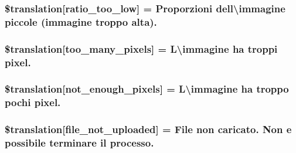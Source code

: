 \subsubsection[{\$translation}]{\setlength{\rightskip}{0pt plus 5cm}\$translation\mbox{[}\textquotesingle{}ratio\+\_\+too\+\_\+low\textquotesingle{}\mbox{]} = \textquotesingle{}Proporzioni dell\textbackslash{}\textquotesingle{}immagine piccole (immagine troppo alta).\textquotesingle{}}\label{class_8upload_8it___i_t_8php_ac533b9a479f056b0b8623e4268f068c2}
\hypertarget{class_8upload_8it___i_t_8php_aa4051ef64e94a3f8295c63cf85544016}{}
\subsubsection[{\$translation}]{\setlength{\rightskip}{0pt plus 5cm}\$translation\mbox{[}\textquotesingle{}too\+\_\+many\+\_\+pixels\textquotesingle{}\mbox{]} = \textquotesingle{}L\textbackslash{}\textquotesingle{}immagine ha troppi pixel.\textquotesingle{}}\label{class_8upload_8it___i_t_8php_aa4051ef64e94a3f8295c63cf85544016}
\hypertarget{class_8upload_8it___i_t_8php_a1fe342c27ce61f4ff4e0120ba647033e}{}
\subsubsection[{\$translation}]{\setlength{\rightskip}{0pt plus 5cm}\$translation\mbox{[}\textquotesingle{}not\+\_\+enough\+\_\+pixels\textquotesingle{}\mbox{]} = \textquotesingle{}L\textbackslash{}\textquotesingle{}immagine ha troppo pochi pixel.\textquotesingle{}}\label{class_8upload_8it___i_t_8php_a1fe342c27ce61f4ff4e0120ba647033e}
\hypertarget{class_8upload_8it___i_t_8php_a4ce76e7be0b3a03c2b47f6d70c21832e}{}
\subsubsection[{\$translation}]{\setlength{\rightskip}{0pt plus 5cm}\$translation\mbox{[}\textquotesingle{}file\+\_\+not\+\_\+uploaded\textquotesingle{}\mbox{]} = \textquotesingle{}File non caricato. Non e possibile terminare il processo.\textquotesingle{}}\label{class_8upload_8it___i_t_8php_a4ce76e7be0b3a03c2b47f6d70c21832e}
\hypertarget{class_8upload_8it___i_t_8php_afd84e910217f04139f567c41e292afa5}{}
